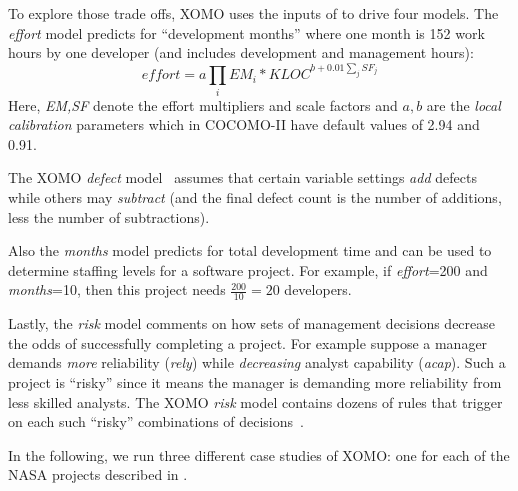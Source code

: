 To explore those trade offs, XOMO uses the inputs of 
to drive  four models. The {\em effort} model predicts for 
``development months'' where one month
is 152 work hours by one developer (and includes development and management hours): 
\begin{equation}\label{eq:cocII}
\mathit{effort}=a\prod_i EM_i *\mathit{KLOC}^{b+0.01\sum_j SF_j}
\end{equation}
Here, {\em EM,SF} denote the effort multipliers and scale
factors and
 $a,b$ are the {\em local calibration} parameters which in COCOMO-II
have default values of 2.94 and 0.91.

The XOMO {\em defect}
model~\cite{boehm00b}  assumes that
certain variable settings {\em add} defects while
others may {\em subtract} (and the final defect count is the number of additions, less the
number of subtractions). 

Also the {\em months} model predicts for total development time and   can be used to determine staffing levels
for a software project. For example, if {\em effort}=200  
and {\em months}=10, then this project needs 
$\frac{200}{10} =20$
developers.

Lastly, the  {\em risk} model comments on how sets of management decisions decrease the 
odds of successfully completing a project. For example suppose a manager demands
{\em more}  reliability ({\em rely}) while  {\em decreasing} analyst capability ({\em acap}).
Such a project is ``risky'' since it means the manager is demanding more reliability from less skilled analysts.
The XOMO {\em risk} model contains dozens of rules that trigger on each
such ``risky'' combinations of decisions~\cite{madachy97}. 

In the following, we run three different case studies
of  XOMO: one for each of the NASA projects described in .
